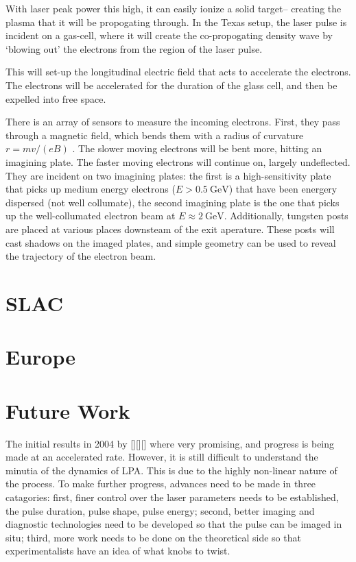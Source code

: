 \documentclass[12pt, titlepage]{article}
\begin{document}
With laser peak power this high, it can easily ionize a solid target-- creating
the plasma that it will be propogating through. In the Texas setup, the laser pulse is incident on a gas-cell, where it will create the co-propogating density wave by `blowing out' the electrons from the region of the laser pulse.

This will set-up the longitudinal electric field that acts to accelerate the electrons. The electrons will be accelerated for the duration of the glass cell, and then be expelled into free space. 

There is an array of sensors to measure the incoming electrons. First, they pass
through a magnetic field, which bends them with a radius of curvature $ r = mv/(eB)$ . The slower moving electrons will be bent more, hitting an imagining plate. The faster moving electrons will continue on, largely undeflected. They are incident on two imagining plates: the first is a high-sensitivity plate that picks up medium energy electrons ($E >\SI{0.5}{\giga\electronvolt}$) that have been energery dispersed (not well collumate), the
second imagining plate is the one that picks up the well-collumated electron beam at $E \approx \SI{2}{\giga\electronvolt}$. Additionally, tungsten posts are placed at various places downsteam of the exit aperature. These posts will
cast shadows on the imaged plates, and simple geometry can be used to reveal
the trajectory of the electron beam.

\section{SLAC}

\section{Europe}

\section{Future Work}

The initial results in 2004 by [][][] where very promising, and progress is being made at an accelerated rate. However, it is still difficult to understand the minutia of the dynamics of LPA. This is due to the highly non-linear nature of the process. To make further progress, advances need to be made in three catagories: first, finer control over the laser parameters needs to be established, the pulse duration, pulse shape, pulse energy; second, better imaging and
diagnostic technologies need to be developed so that the pulse can be imaged in situ; third, more work needs to be done on the theoretical side so that experimentalists have an idea of what knobs to twist.
\end{document}
